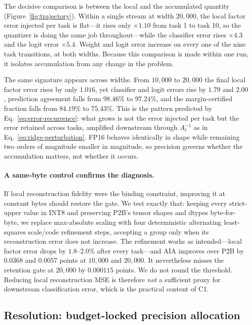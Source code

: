 \documentclass{article}
\begin{document}
The decisive comparison is between the local and the accumulated quantity
(Figure~\ref{fig:trajectory}). Within a single stream at width $20{,}000$, the
local factor error injected per task is flat---it rises only $\times1.10$ from
task 1 to task 10, so the quantizer is doing the same job throughout---while
the classifier error rises $\times4.3$ and the logit error $\times5.4$. Weight
and logit error increase on every one of the nine task transitions, at both
widths. Because this comparison is made within one run, it isolates
accumulation from any change in the problem.

The same signature appears across widths. From $10{,}000$ to $20{,}000$ the
final local factor error rises by only $1.016$, yet classifier and logit errors
rise by $1.79$ and $2.00$, prediction agreement falls from $98.46\%$ to
$97.24\%$, and the margin-certified fraction falls from $84.19\%$ to $75.43\%$.
This is the pattern predicted by Eq.~\ref{eq:error-recurrence}: what grows is
not the error injected per task but the error retained across tasks, amplified
downstream through $A_t^{-1}$ as in Eq.~\ref{eq:ridge-perturbation}. FP16
behaves identically in shape while remaining two orders of magnitude smaller in
magnitude, so precision governs whether the accumulation matters, not whether
it occurs.

\paragraph{A same-byte control confirms the diagnosis.}
If local reconstruction fidelity were the binding constraint, improving it at
constant bytes should restore the gate. We test exactly that: keeping every
strict-upper value in INT8 and preserving P2B's tensor shapes and dtypes
byte-for-byte, we replace max-absolute scaling with four deterministic
alternating least-squares scale/code refinement steps, accepting a group only
when its reconstruction error does not increase. The refinement works as
intended---local factor error drops by $1.8$--$2.0\%$ after every task---and
AIA improves over P2B by $0.0368$ and $0.0057$ points at $10{,}000$ and
$20{,}000$. It nevertheless misses the retention gate at $20{,}000$ by
$0.000115$ points. We do not round the threshold. Reducing local reconstruction
MSE is therefore \emph{not} a sufficient proxy for downstream classification
error, which is the practical content of C1.

\subsection{Resolution: budget-locked precision allocation}
\label{sec:adaptive}
\end{document}
